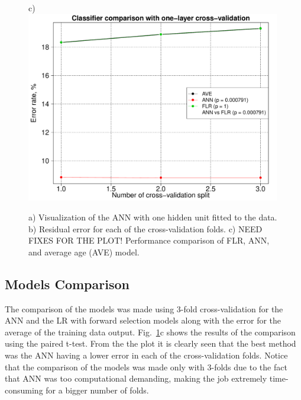 \documentclass[10pt, paper=a4]{article}
\begin{document}
\begin{figure}[h]
\begin{minipage}{0.3\textwidth}
  \end{minipage} \hfill
  \begin{minipage}{0.3\textwidth}
    c)\\
    \includegraphics[width = 0.99\textwidth]{Regression_comparison1.pdf}
  \end{minipage} \vfill
  \caption{a) Visualization of the ANN with one hidden unit fitted to
    the data.  b) Residual error for each of the cross-validation
    folds.  c) {\color{red} NEED FIXES FOR THE PLOT!} Performance
    comparison of FLR, ANN, and average age (AVE) model.}
  \label{fig:ann_lr}
\end{figure}


\subsection{Models Comparison}
The comparison of the models was made using 3-fold cross-validation
for the ANN and the LR with forward selection models along with the
error for the average of the training data output.
Fig.~\ref{fig:ann_lr}c shows the results of the comparison using the
paired t-test.  From the the plot it is clearly seen that the best
method was the ANN having a lower error in each of the
cross-validation folds.  Notice that the comparison of the models was
made only with 3-folds due to the fact that ANN was too computational
demanding, making the job extremely time-consuming for a bigger number
of folds.

\end{document}
